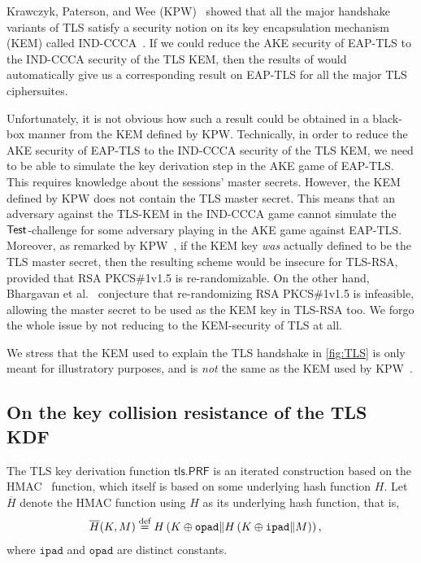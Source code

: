 Krawczyk, Paterson, and Wee (KPW)~\cite{C:KraPatWee13} showed that all the major handshake variants of TLS satisfy a security notion on its key encapsulation mechanism (KEM) called IND-CCCA~\cite{C:HofKil07}. 
If we could reduce the AKE security of EAP-TLS to the IND-CCCA security of the TLS KEM,
then the results of \cite{C:KraPatWee13} would automatically give us a corresponding result on EAP-TLS for all the major TLS ciphersuites.

Unfortunately,
it is not obvious how such a result could be obtained in a black-box manner from the KEM defined by KPW.
Technically,
in order to reduce the AKE security of EAP-TLS to the IND-CCCA security of the TLS KEM,
we need to be able to simulate the key derivation step in the AKE game of EAP-TLS.
This requires knowledge about the sessions' master secrets.
However,
the KEM defined by KPW does not contain the TLS master secret. 
This means that an adversary against the TLS-KEM in the IND-CCCA game
cannot simulate the $\mathsf{Test}$-challenge for some adversary playing in the AKE game against EAP-TLS. 
Moreover,
as remarked by KPW~\cite[Remark~4]{C:KraPatWee13},
if the KEM key \emph{was} actually defined to be the TLS master secret,
then the resulting scheme would be insecure for TLS-RSA,
provided that RSA PKCS\#1v1.5 is re-randomizable.
On the other hand, 
Bhargavan et al.~\cite{C:BFKPSZ14}
conjecture that re-randomizing RSA PKCS\#1v1.5 is infeasible, 
allowing the master secret to be used as the KEM key in TLS-RSA too.
We forgo the whole issue by not reducing to the KEM-security of TLS at all. 


We stress that the KEM used to explain the TLS handshake in \cref{fig:TLS} is only meant for illustratory purposes,
and is \emph{not} the same as the KEM used by KPW~\cite{C:KraPatWee13}.


\subsection{On the key collision resistance of the TLS KDF}\label{sec:tls.PRF_collision_resistance}


\newcommand{\HMAC}{\overline{H}}
\newcommand{\padI}{\mathtt{ipad}}
\newcommand{\padO}{\mathtt{opad}}


The TLS key derivation function $\mathsf{tls.PRF}$ is an iterated construction based on the  HMAC~\cite{IETF:RFC2104:HMAC} function,
which itself is based on some underlying  hash function $H$. 
Let $\HMAC$ denote the HMAC function using $H$ as its underlying hash function,
that is,
\begin{align}
	\HMAC(\Key, M) &\overset{\text{def}}{=} H \left( \Key \oplus \padO \concat H\left( \Key \oplus \padI \concat M \right) \right) \label{eq:HMAC:def} , %
\end{align}
where $\padI$ and $\padO$ are distinct constants.

